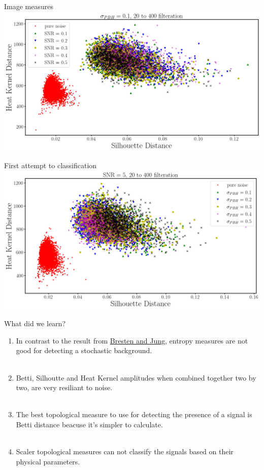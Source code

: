\begin{frame}{Image measures}
	\centering
	\includegraphics[height=.8\textheight]{img/SD_HK_SNR}
\end{frame}

\begin{frame}{First attempt to classification}
	\centering
	\includegraphics[height=.8\textheight]{img/SD_HK_sig}

\end{frame}

\begin{frame}{What did we learn?}
\begin{enumerate}[<+->]
	\item In contrast to the result from \href{https://arxiv.org/abs/1910.08245}{Bresten and Jung}, entropy measures are not good for detecting a stochastic background.\\~\\
	\item Betti, Silhoutte and Heat Kernel amplitudes when combined together two by two, are very resiliant to noise.\\~\\
	\item The best topological measure to use for detecting the presence of a signal is Betti distance beacuse it's simpler to calculate.\\~\\
	\item Scaler topological measures can not classify the signals based on their physical parameters.\\~\\
\end{enumerate}
\end{frame}

